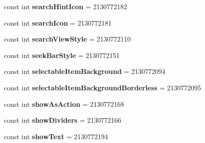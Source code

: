 \begin{DoxyCompactItemize}
const int {\bfseries search\+Hint\+Icon} = 2130772182
\item 
\mbox{\label{class_pinned_app_1_1_droid_1_1_resource_1_1_attribute_ab2b97b93e7d84f18c81874f59018c78a}} 
const int {\bfseries search\+Icon} = 2130772181
\item 
\mbox{\label{class_pinned_app_1_1_droid_1_1_resource_1_1_attribute_a2d8745cf978fd472dea8778e8078faf6}} 
const int {\bfseries search\+View\+Style} = 2130772110
\item 
\mbox{\label{class_pinned_app_1_1_droid_1_1_resource_1_1_attribute_a69c049a2243263751136adcd53021a78}} 
const int {\bfseries seek\+Bar\+Style} = 2130772151
\item 
\mbox{\label{class_pinned_app_1_1_droid_1_1_resource_1_1_attribute_a4821ad68beed8a8d62c16477ca4af314}} 
const int {\bfseries selectable\+Item\+Background} = 2130772094
\item 
\mbox{\label{class_pinned_app_1_1_droid_1_1_resource_1_1_attribute_aa7c67cc2eea49f7d2fe64da2205be354}} 
const int {\bfseries selectable\+Item\+Background\+Borderless} = 2130772095
\item 
\mbox{\label{class_pinned_app_1_1_droid_1_1_resource_1_1_attribute_ad6d6af76bf3b64915926e109b9299f88}} 
const int {\bfseries show\+As\+Action} = 2130772168
\item 
\mbox{\label{class_pinned_app_1_1_droid_1_1_resource_1_1_attribute_ac0d8fc25ce4fb864e11afe2adb24938a}} 
const int {\bfseries show\+Dividers} = 2130772166
\item 
\mbox{\label{class_pinned_app_1_1_droid_1_1_resource_1_1_attribute_af9e6113e9cb9c777e0274477355a93aa}} 
const int {\bfseries show\+Text} = 2130772194
\item 
\mbox{\label{class_pinned_app_1_1_droid_1_1_resource_1_1_attribute_a49825997385cbdf7a52ca3fb4c89c89d}} 

\end{DoxyCompactItemize}
